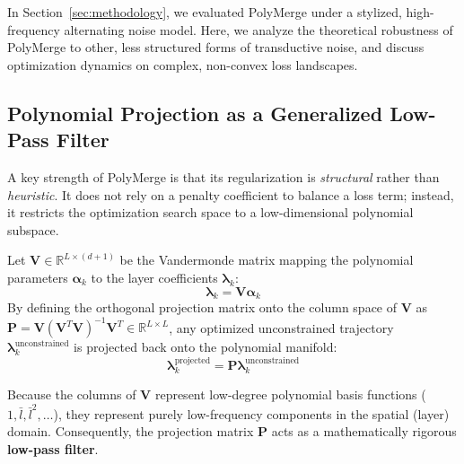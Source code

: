 In Section~\ref{sec:methodology}, we evaluated PolyMerge under a stylized, high-frequency alternating noise model. Here, we analyze the theoretical robustness of PolyMerge to other, less structured forms of transductive noise, and discuss optimization dynamics on complex, non-convex loss landscapes.

\subsection{Polynomial Projection as a Generalized Low-Pass Filter}
A key strength of PolyMerge is that its regularization is \emph{structural} rather than \emph{heuristic}. It does not rely on a penalty coefficient to balance a loss term; instead, it restricts the optimization search space to a low-dimensional polynomial subspace.

Let $\mathbf{V} \in \mathbb{R}^{L \times (d+1)}$ be the Vandermonde matrix mapping the polynomial parameters $\boldsymbol{\alpha}_k$ to the layer coefficients $\boldsymbol{\lambda}_k$:
\begin{equation}
\boldsymbol{\lambda}_k = \mathbf{V} \boldsymbol{\alpha}_k
\end{equation}
By defining the orthogonal projection matrix onto the column space of $\mathbf{V}$ as $\mathbf{P} = \mathbf{V}(\mathbf{V}^T\mathbf{V})^{-1}\mathbf{V}^T \in \mathbb{R}^{L \times L}$, any optimized unconstrained trajectory $\boldsymbol{\lambda}_k^{\text{unconstrained}}$ is projected back onto the polynomial manifold:
\begin{equation}
\boldsymbol{\lambda}_k^{\text{projected}} = \mathbf{P} \boldsymbol{\lambda}_k^{\text{unconstrained}}
\end{equation}

Because the columns of $\mathbf{V}$ represent low-degree polynomial basis functions ($1, \bar{l}, \bar{l}^2, \dots$), they represent purely low-frequency components in the spatial (layer) domain. Consequently, the projection matrix $\mathbf{P}$ acts as a mathematically rigorous \textbf{low-pass filter}. 

